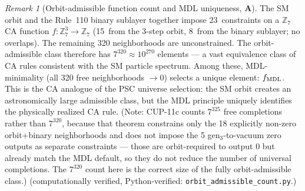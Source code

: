 \documentclass[11pt]{article}
\theoremstyle{remark}
\newtheorem{remark}[theorem]{Remark}
\newcommand{\CatA}{\textbf{A}}
\begin{document}
\begin{remark}[Orbit-admissible function count and MDL uniqueness, $\CatA$]
\label{rem:orbit_admissible}
The SM orbit and the Rule~110 binary sublayer together impose 23~constraints on a $\mathbb{Z}_7$
CA function $f: \mathbb{Z}_7^3 \to \mathbb{Z}_7$ (15~from the 3-step orbit,
8~from the binary sublayer; no overlaps). The remaining 320 neighborhoods are unconstrained.
The orbit-admissible class therefore has $7^{320} \approx 10^{270}$ elements --- a vast
equivalence class of CA rules consistent with the SM particle spectrum.
Among these, MDL-minimality (all 320 free neighborhoods $\to 0$) selects a unique element:
$f_{\rm MDL}$. This is the CA analogue of the PSC universe selection:
the SM orbit creates an astronomically large admissible class, but the MDL principle
uniquely identifies the physically realized CA rule.
(Note: CUP-11c counts $7^{325}$ free completions rather than $7^{320}$, because
that theorem constrains only the 18 explicitly non-zero orbit+binary neighborhoods
and does not impose the 5 gen$_3$-to-vacuum zero outputs as separate constraints
--- those are orbit-required to output 0 but already match the MDL default, so they
do not reduce the number of universal completions.
The $7^{320}$ count here is the correct size of the fully orbit-admissible class.)
(computationally verified, Python-verified: \texttt{orbit\_admissible\_count.py}.)
\end{remark}
\end{document}
